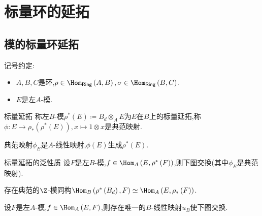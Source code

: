 \chapter{标量环的延拓}

\section{模的标量环延拓}

记号约定:

\begin{itemize}
	\item $A,B,C$是环,$\rho\in\Hom_{\mathsf{Ring}}\left(A,B\right),\sigma\in\Hom_{\mathsf{Ring}}\left(B,C\right)$.
	\item $E$是左$A$-模.
\end{itemize}

\begin{definition}{标量延拓}{}
	称左$B$-模$\rho^{\ast}\left(E\right)\coloneq B_{d}\otimes_{A}E$为$E$在$B$上的标量延拓,称$\phi:E\to\rho_{\ast}\left(\rho^{\ast}\left(E\right)\right),x\mapsto 1\otimes x$是典范映射.
\end{definition}

\begin{proposition}{}{}
	典范映射$\phi_{E}$是$A$-线性映射,$\phi\left(E\right)$生成$\rho^{\ast}\left(E\right)$.
\end{proposition}

\begin{proposition}{标量延拓的泛性质}{}
	设$F$是左$B$-模,$f\in\Hom_{A}\left(E,\rho^{\ast}\left(F\right)\right)$,则下图交换(其中$\phi_{E}$是典范映射).
	\begin{center}
	\end{center}
\end{proposition}

\begin{proposition}{}{}
	存在典范的$\Z$-模同构$\Hom_{B}\left(\rho^{\ast}\left(B_{d}\right),F\right)\simeq\Hom_{A}\left(E,\rho_{\ast}\left(F\right)\right)$.
\end{proposition}

\begin{corollary}{}{}
	设$F$是左$A$-模,$f\in\Hom_{A}\left(E,F\right)$,则存在唯一的$B$-线性映射$u_{B}$使下图交换.
	\begin{center}
	\end{center}
\end{corollary}

